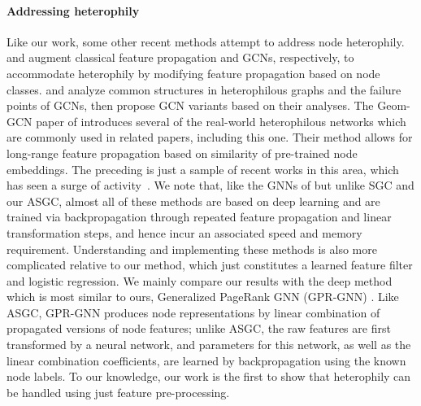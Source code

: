 \documentclass{article}
\newcommand{\Dan}[1]{\textcolor{cyan}{Dan: #1}}
\newcommand{\Cam}[1]{\textcolor{blue}{Cam: #1}}
\begin{document}
\paragraph{Addressing heterophily} Like our work, some other recent methods attempt to address node heterophily. 
\citet{gatterbauer2014semi} and \citet{zhu2020graph} augment classical feature propagation and GCNs, respectively, to accommodate heterophily by modifying feature propagation based on node classes. \citet{zhu2020beyond} and \citet{yan2021two} analyze common structures in heterophilous graphs and the failure points of GCNs, then propose GCN variants based on their analyses.
The Geom-GCN paper of \citet{pei2020geom} introduces several of the real-world heterophilous networks which are commonly used in related papers, including this one. Their method allows for long-range feature propagation based on similarity of pre-trained node embeddings.
The preceding is just a sample of recent works in this area, which has seen a surge of activity~\citep{liu2020non, luan2021heterophily, suresh2021breaking}.
We note that, like the GNNs of \citet{kipf2016semi} but unlike SGC and our ASGC, almost all of these methods are based on deep learning and are trained via backpropagation through repeated feature propagation and linear transformation steps, and hence incur an associated speed and memory requirement. Understanding and implementing these methods is also more complicated relative to our method, which just constitutes a learned feature filter and logistic regression.
We mainly compare our results with the deep method which is most similar to ours, Generalized PageRank GNN (GPR-GNN) \citep{chien2020adaptive}. Like ASGC, GPR-GNN produces node representations by linear combination of propagated versions of node features; unlike ASGC, the raw features are first transformed by a neural network, and parameters for this network, as well as the linear combination coefficients, are learned by backpropagation using the known node labels. 
To our knowledge, our work is the first to show that heterophily can be handled using just feature pre-processing.
\end{document}
